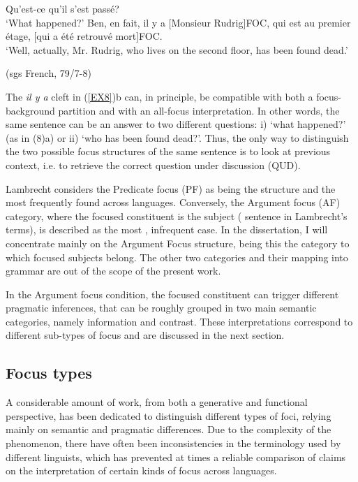 \documentclass[12pt]{report}
\begin{document}
\pex \label{EX8}
\a Qu'est-ce qu'il s'est passé? \\
 ‘What happened?'
\a Ben, en fait, il y a [Monsieur Rudrig]\tiny{FOC}, \normalsize{qui est au premier étage, [qui a été retrouvé mort]}\tiny{FOC}. \\
\normalsize‘Well, actually, Mr. Rudrig, who lives on the second floor, has been found dead.'


(sgs French, 79/7-8)
\xe

\noindent
The \textit{il y a} cleft in (\ref{EX8})b can, in principle, be compatible with both a focus-background partition and with an all-focus interpretation. In other words, the same sentence can be an answer to two different questions: i) ‘what happened?' (as in (8)a) or ii) ‘who has been found dead?'. Thus, the only way to distinguish the two possible focus structures of the same sentence is to look at previous context, i.e. to retrieve the correct question under discussion (QUD). 


Lambrecht \cite{lambrecht2010constraints} considers the Predicate focus (PF) as being the  structure and the most frequently found across languages. 
Conversely, the Argument focus (AF) category, where the focused constituent is the subject ( sentence in Lambrecht's terms), is described as the most , infrequent case. 
In the dissertation, I will concentrate mainly on the Argument Focus structure, being this the category to which focused subjects belong. The other two categories and their mapping into grammar are out of the scope of the present work.

In the Argument focus condition, the focused constituent can trigger different pragmatic inferences, that can be roughly grouped in two main semantic categories, namely information and contrast. These interpretations correspond to different sub-types of focus and are discussed in the next section.\\



\subsection{Focus types} \label{type}

A considerable amount of work, from both a generative and functional perspective,  has been dedicated to distinguish different types of foci, relying mainly on semantic and pragmatic differences. Due to the complexity of the phenomenon, there have often been  inconsistencies in the terminology used by different linguists, which has prevented at times a reliable comparison of claims on the interpretation of certain kinds of focus across languages. 
\end{document}
